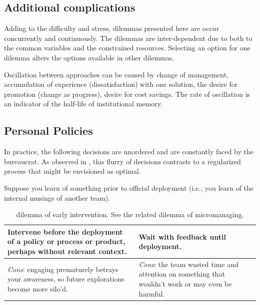 \subsection{Additional complications}
Adding to the difficulty and stress, dilemmas presented here are occur concurrently and continuously. The dilemmas are inter-dependent due to both to the common variables and the constrained resources.
Selecting an option for one dilemma alters the options available in other dilemmas.

Oscillation between approaches can be caused by change of management, accumulation of experience (dissatisfaction) with one solution, the desire for promotion (change as progress), desire for cost savings. The rate of oscillation is an indicator of the half-life of institutional memory. 


\subsection{Personal Policies}

In practice, the following decisions are unordered and are constantly faced by the bureaucrat. As observed in \cite{1959_Lindblom}, this flurry of decisions contrasts to a regularized process that might be envisioned as optimal.


Suppose you learn of something prior to official deployment (i.e., you learn of the internal musings of another team).  
\begin{center}
\begin{table}[ht]
\begin{tabular}{ | m{\dilemmatablewidth}| m{\dilemmatablewidth} | } 
  \hline
  \textbf{Intervene before the deployment of a policy or process or product, perhaps without relevant context.} &
  \textbf{Wait with feedback until deployment.} \\
  \hline
  \textit{Cons}: engaging prematurely betrays your awareness, so future explorations become more silo'd. & 
  \textit{Cons}: the team wasted time and attention on something that wouldn't work or may even be harmful. \\
  \hline
\end{tabular}
\caption{dilemma of early intervention. See the related dilemma of micromanaging.}
\label{table:early-intervention}
\end{table}
\end{center}

